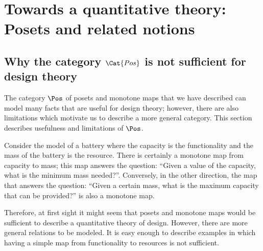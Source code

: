 \section{Towards a quantitative theory: Posets and related notions}








\subsection{Why the category $\Cat{Pos}$ is not sufficient for design theory}


The category $\Pos$ of posets and monotone maps that we have described
can model many facts that are useful for design theory; however, there are also
limitations which motivate us to describe a more general category.
This section describes usefulness and limitations of $\Pos$.

\begin{example}[Battery]
    Consider the model of a battery where the capacity is the functionality
    and the mass of the battery is the resource. There is certainly
    a monotone map from capacity to mass; this map answers the question: ``Given a value of the capacity, what is the minimum mass needed?''. Conversely,
    in the other direction, the map that answers the question: ``Given a certain mass, what is the maximum capacity that can be provided?'' is also
    a monotone map.
\end{example}

\begin{figure}[h!]
    \centering
    \caption{\label{fig:battery-example}}
\end{figure}

Therefore, at first sight it might seem that posets and monotone maps
would be sufficient to describe a quantitative theory of design.
However, there are more general relations to be modeled. It is easy enough
to describe examples in which having a simple map from functionality
to resources is not sufficient.

